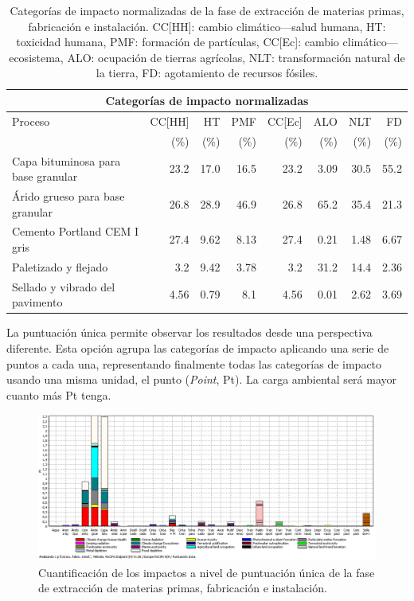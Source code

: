 \begin{table}[!htb]
\centering
\begin{tabular}{p{4cm}rrrrrrr}
\toprule
\multicolumn{8}{c}{Categorías de impacto normalizadas}\\
\midrule
Proceso & CC[HH] & HT & PMF & CC[Ec] & ALO & NLT & FD\\
 &  (\%) & (\%) & (\%) & (\%) & (\%) & (\%) & (\%)\\
\midrule
Capa bituminosa para base granular & 23.2 & 17.0 & 16.5 & 23.2 & 3.09 & 30.5 & 55.2\\
Árido grueso para base granular & 26.8 & 28.9 & 46.9 & 26.8 & 65.2 & 35.4 & 21.3\\
Cemento Portland CEM I gris & 27.4 & 9.62 & 8.13 & 27.4 & 0.21 & 1.48 & 6.67\\
Paletizado y flejado & 3.2 & 9.42 & 3.78 & 3.2 & 31.2 & 14.4 & 2.36\\
Sellado y vibrado del pavimento & 4.56 & 0.79 & 8.1 & 4.56 & 0.01 & 2.62 & 3.69\\
\bottomrule
\end{tabular}
\caption[Categorías de impacto normalizadas de la fase de extracción de materias primas, fabricación e instalación.]{Categorías de impacto normalizadas de la fase de extracción de materias primas, fabricación e instalación. CC[HH]: cambio climático—salud humana, HT: toxicidad humana, PMF: formación de partículas, CC[Ec]: cambio climático—ecosistema, ALO: ocupación de tierras agrícolas, NLT: transformación natural de la tierra, FD: agotamiento de recursos fósiles.}
\label{categoriasimpactofabricacion}
\end{table}

La puntuación única permite observar los resultados desde una perspectiva diferente. Esta opción agrupa las categorías de impacto aplicando una serie de puntos a cada una, representando finalmente todas las categorías de impacto usando una misma unidad, el punto (\textit{Point}, Pt). La carga ambiental será mayor cuanto más Pt tenga.

\begin{figure}[!htb]
\centering
\includegraphics[width=15cm]{img/fabric_puntuacionunica.png}
\caption{Cuantificación de los impactos a nivel de puntuación única de la fase de extracción de materias primas, fabricación e instalación.}
\label{fig:fabric_puntuacionunica}
\end{figure}

